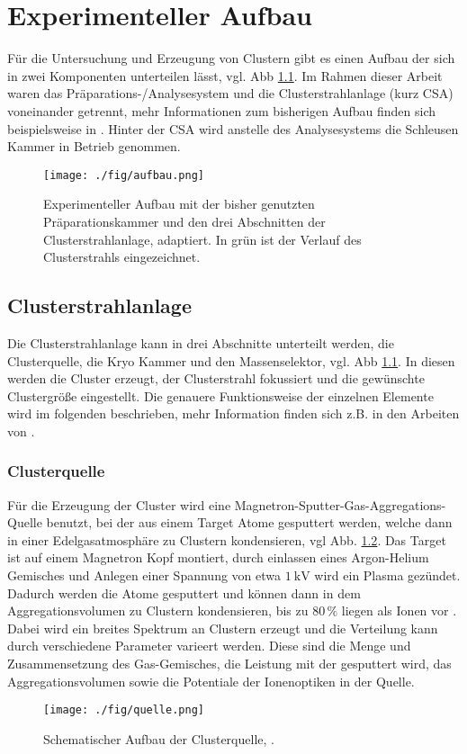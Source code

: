\chapter{Experimenteller Aufbau}
Für die Untersuchung und Erzeugung von Clustern gibt es einen Aufbau der sich in zwei Komponenten unterteilen lässt, vgl. Abb \ref{fig:csaaufbau}.
Im Rahmen dieser Arbeit waren das Präparations-/Analysesystem und die Clusterstrahlanlage (kurz CSA) voneinander getrennt, mehr Informationen zum bisherigen Aufbau finden sich beispielsweise in \cite{wolter}.
Hinter der CSA wird anstelle des Analysesystems die Schleusen Kammer in Betrieb genommen.
\begin{figure}
    \centering
    \texttt{[image: ./fig/aufbau.png]}
    \caption{Experimenteller Aufbau mit der bisher genutzten Präparationskammer und den drei Abschnitten der Clusterstrahlanlage, \cite[S. 20]{wolter} adaptiert. 
    In grün ist der Verlauf des Clusterstrahls eingezeichnet.}
    \label{fig:csaaufbau}
\end{figure}

\section{Clusterstrahlanlage}
Die Clusterstrahlanlage kann in drei Abschnitte unterteilt werden, die Clusterquelle, die Kryo Kammer und den Massenselektor, vgl. Abb \ref{fig:csaaufbau}.
In diesen werden die Cluster erzeugt, der Clusterstrahl fokussiert und die gewünschte Clustergröße eingestellt.
Die genauere Funktionsweise der einzelnen Elemente wird im folgenden beschrieben, mehr Information finden sich z.B. in den Arbeiten von \cite{duffe, wolter, schröder}.
\subsection{Clusterquelle}
Für die Erzeugung der Cluster wird eine Magnetron-Sputter-Gas-Aggregations-Quelle benutzt, bei der aus einem Target Atome gesputtert werden, welche dann in einer Edelgasatmosphäre zu Clustern kondensieren, vgl Abb. \ref{fig:quelle}.
Das Target ist auf einem Magnetron Kopf montiert, durch einlassen eines Argon-Helium Gemisches und Anlegen einer Spannung von etwa $\SI{1}{\kV}$ wird ein Plasma gezündet.
Dadurch werden die Atome gesputtert und können dann in dem Aggregationsvolumen zu Clustern kondensieren, bis zu $80\,\%$ liegen als Ionen vor \cite{Haberland.1991}.
Dabei wird ein breites Spektrum an Clustern erzeugt und die Verteilung kann durch verschiedene Parameter varieert werden.
Diese sind die Menge und Zusammensetzung des Gas-Gemisches, die Leistung mit der gesputtert wird, das Aggregationsvolumen sowie die Potentiale der Ionenoptiken in der Quelle.
\begin{figure}
    \centering
    \texttt{[image: ./fig/quelle.png]}
    \caption{Schematischer Aufbau der Clusterquelle, \cite{woltermaster}.}
    \label{fig:quelle}
\end{figure}
